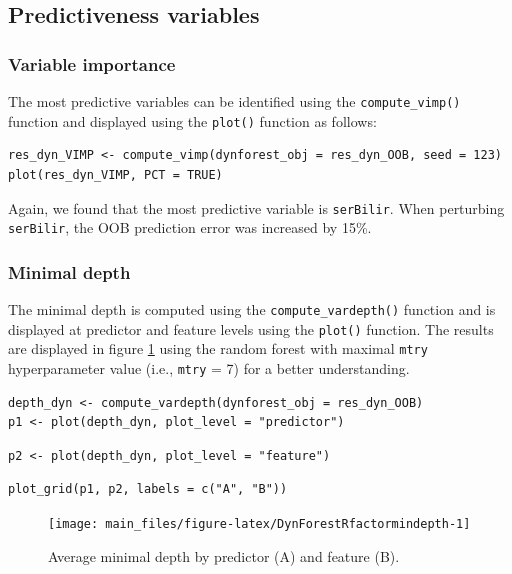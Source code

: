 \subsection{Predictiveness variables}\label{predictiveness-variables}

\subsubsection{Variable importance}\label{variable-importance-2}

The most predictive variables can be identified using the \texttt{compute\_vimp()} function and displayed using the \texttt{plot()} function as follows:

\begin{verbatim}
res_dyn_VIMP <- compute_vimp(dynforest_obj = res_dyn_OOB, seed = 123)
plot(res_dyn_VIMP, PCT = TRUE)
\end{verbatim}

Again, we found that the most predictive variable is \texttt{serBilir}. When perturbing \texttt{serBilir}, the OOB prediction error was increased by 15\%.

\subsubsection{Minimal depth}\label{minimal-depth-2}

The minimal depth is computed using the \texttt{compute\_vardepth()} function and is displayed at predictor and feature levels using the \texttt{plot()} function. The results are displayed in figure \ref{fig:DynForestRfactormindepth} using the random forest with maximal \texttt{mtry} hyperparameter value (i.e., \texttt{mtry} = 7) for a better understanding.

\begin{verbatim}
depth_dyn <- compute_vardepth(dynforest_obj = res_dyn_OOB)
p1 <- plot(depth_dyn, plot_level = "predictor")
\end{verbatim}

\begin{verbatim}
p2 <- plot(depth_dyn, plot_level = "feature")
\end{verbatim}

\begin{verbatim}
plot_grid(p1, p2, labels = c("A", "B"))
\end{verbatim}

\begin{figure}

{\centering \texttt{[image: main\_files/figure-latex/DynForestRfactormindepth-1]} 

}

\caption{Average minimal depth by predictor (A) and feature (B).}\label{fig:DynForestRfactormindepth}
\end{figure}

